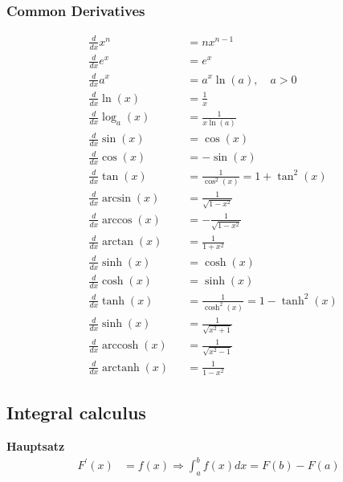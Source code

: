 \subsubsection{Common Derivatives}
\noindent
\begin{align*}
     & \frac{d}{dx}x^n                       &  & =nx^{n-1}                              \\
     & \frac{d}{dx}e^x                       &  & =e^x                                   \\
     & \frac{d}{dx}a^x                       &  & =a^x\ln(a),\quad a>0                   \\
     & \frac{d}{dx}\ln(x)                    &  & =\frac1x                               \\
     & \frac{d}{dx}\log_a(x)                 &  & =\frac1{x\ln(a)}                       \\
     & \frac{d}{dx}\sin(x)                   &  & =\cos(x)                               \\
     & \frac{d}{dx}\cos(x)                   &  & =-\sin(x)                              \\
     & \frac{d}{dx}\tan(x)                   &  & =\frac1{\cos^2(x)}=1+\tan^2(x)         \\
     & \frac{d}{dx}\arcsin(x)                &  & =\frac1{\sqrt{1-x^2}}                  \\
     & \frac{d}{dx}\arccos(x)                &  & =-\frac1{\sqrt{1-x^2}}                 \\
     & \frac{d}{dx}\arctan(x)                &  & =\frac1{1+x^2}                         \\
     & \frac{d}{dx}\sinh(x)                  &  & =\cosh(x)                              \\
     & \frac{d}{dx}\cosh(x)                  &  & =\sinh(x)                              \\
     & \frac{d}{dx}\tanh(x)                  &  & =\frac{1}{\cosh^{2}(x)}=1-\tanh^{2}(x) \\
     & \frac{d}{dx}\sinh(x)                  &  & =\frac1{\sqrt{x^2+1}}                  \\
     & \frac{d}{dx}\operatorname{arccosh}(x) &  & =\frac1{\sqrt{x^2-1}}                  \\
     & \frac{d}{dx}\operatorname{arctanh}(x) &  & =\frac1{1-x^2}
\end{align*}

\subsection{Integral calculus}
\textbf{Hauptsatz}
\begin{align*}
    F^{\prime}(x) & =f(x)\Longrightarrow\int_a^b f(x)dx=F(b)-F(a)
\end{align*}

